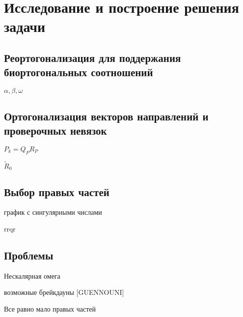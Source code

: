 \section{Исследование и построение решения задачи}
\label{sec:Chapter3} 

\subsection{Реортогонализация для поддержания биортогональных соотношений}
$\alpha, \beta, \omega$
\subsection{Ортогонализация векторов направлений и проверочных невязок}
$P_k = Q_PR_P$\\
\par $\tilde{R}_0$\\

\subsection{Выбор правых частей}
график с сингулярными числами
\par rrqr
\subsection{Проблемы}
Нескалярная омега
\par возможные брейкдауны [GUENNOUNI]
\par Все равно мало правых частей

\newpage
